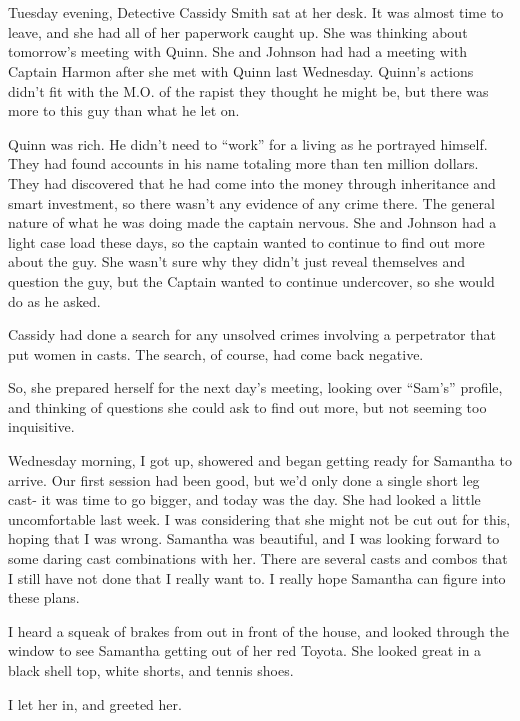 \chapter{}
Tuesday evening, Detective Cassidy Smith sat at her desk. It was almost time to leave, and
she had all of her paperwork caught up. She was thinking about tomorrow's meeting with Quinn.
She and Johnson had had a meeting with Captain Harmon after she met with Quinn last Wednesday.
Quinn's actions didn't fit with the M.O. of the rapist they thought he might be, but there was
more to this guy than what he let on.

Quinn was rich. He didn't need to ``work'' for a living as he portrayed himself. They had
found accounts in his name totaling more than ten million dollars. They had discovered that he
had come into the money through inheritance and smart investment, so there wasn't any evidence
of any crime there. The general nature of what he was doing made the captain nervous. She and
Johnson had a light case load these days, so the captain wanted to continue to find out more
about the guy. She wasn't sure why they didn't just reveal themselves and question the guy, but
the Captain wanted to continue undercover, so she would do as he asked.

Cassidy had done a search for any unsolved crimes involving a perpetrator that put women
in casts. The search, of course, had come back negative.

So, she prepared herself for the next day's meeting, looking over ``Sam's'' profile, and
thinking of questions she could ask to find out more, but not seeming too inquisitive.

Wednesday morning, I got up, showered and began getting ready for Samantha to arrive. Our
first session had been good, but we'd only done a single short leg cast- it was time to go
bigger, and today was the day. She had looked a little uncomfortable last week. I was
considering that she might not be cut out for this, hoping that I was wrong. Samantha was
beautiful, and I was looking forward to some daring cast combinations with her. There are
several casts and combos that I still have not done that I really want to. I really hope
Samantha can figure into these plans.

I heard a squeak of brakes from out in front of the house, and looked through the window to
see Samantha getting out of her red Toyota. She looked great in a black shell top, white shorts,
and tennis shoes.

I let her in, and greeted her.

